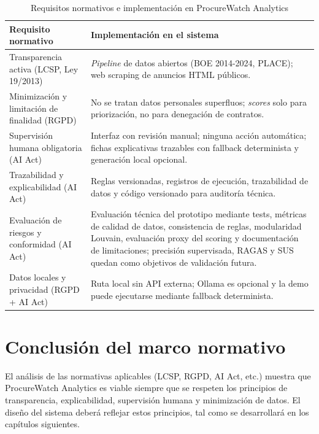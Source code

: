 \documentclass[11pt,a4paper,spanish]{book}
\numberwithin{equation}{chapter}
\numberwithin{figure}{chapter}
\begin{document}
\begin{table}[h]
\centering
\caption{Requisitos normativos e implementación en ProcureWatch Analytics}
\label{tab:normativa_impl}
\begin{tabular}{|p{4.5cm}|p{9cm}|}
\hline
\textbf{Requisito normativo} & \textbf{Implementación en el sistema} \\
\hline
Transparencia activa (LCSP, Ley 19/2013) & \textit{Pipeline} de datos abiertos (BOE 2014-2024, PLACE); web scraping de anuncios HTML públicos. \\
\hline
Minimización y limitación de finalidad (RGPD) & No se tratan datos personales superfluos; \textit{scores} solo para priorización, no para denegación de contratos. \\
\hline
Supervisión humana obligatoria (AI Act) & Interfaz con revisión manual; ninguna acción automática; fichas explicativas trazables con fallback determinista y generaci{\'o}n local opcional. \\
\hline
Trazabilidad y explicabilidad (AI Act) & Reglas versionadas, registros de ejecución, trazabilidad de datos y código versionado para auditoría técnica. \\
\hline
Evaluación de riesgos y conformidad (AI Act) & Evaluación técnica del prototipo mediante tests, métricas de calidad de datos, consistencia de reglas, modularidad Louvain, evaluación proxy del scoring y documentación de limitaciones; precisión supervisada, RAGAS y SUS quedan como objetivos de validación futura. \\
\hline
Datos locales y privacidad (RGPD + AI Act) & Ruta local sin API externa; Ollama es opcional y la demo puede ejecutarse mediante fallback determinista. \\
\hline
\end{tabular}
\end{table}


\section{Conclusión del marco normativo}

El análisis de las normativas aplicables (LCSP, RGPD, AI Act, etc.) muestra que ProcureWatch Analytics es viable siempre que se respeten los principios de transparencia, explicabilidad, supervisión humana y minimización de datos. El diseño del sistema deberá reflejar estos principios, tal como se desarrollará en los capítulos siguientes.


\end{document}
